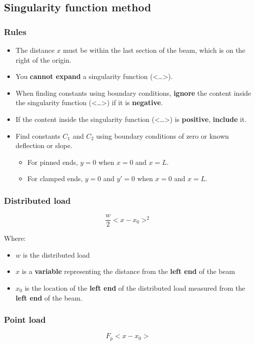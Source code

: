 \documentclass[11pt]{article}
\begin{document}
\newpage

\subsection{Singularity function method}
\label{sec:orge61f9f4}

\subsubsection{Rules}
\label{sec:org301f83d}
\begin{itemize}
\item The distance \(x\) must be within the last section of the beam, which is on the right of the origin.
\item You \textbf{cannot expand} a singularity function (<\ldots{}>).
\item When finding constants using boundary conditions, \textbf{ignore} the content inside the singularity function (<\ldots{}>) if it is \textbf{negative}.
\item If the content inside the singularity function (<\ldots{}>) is \textbf{positive}, \textbf{include} it.
\item Find constants \(C_1\) and \(C_2\) using boundary conditions of zero or known deflection or slope.
\begin{itemize}
\item For pinned ends, \(y = 0\) when \(x = 0\) and \(x = L\).
\item For clamped ends, \(y = 0\) and \(y' = 0\) when \(x = 0\) and \(x = L\).
\end{itemize}
\end{itemize}

\subsubsection{Distributed load}
\label{sec:orgb33c6a5}
\[\frac{w}{2} < x - x_0 >^2\]

Where:
\begin{itemize}
\item \(w\) is the distributed load
\item \(x\) is a \textbf{variable} representing the distance from the \textbf{left end} of the beam
\item \(x_0\) is the location of the \textbf{left end} of the distributed load measured from the \textbf{left end} of the beam.
\end{itemize}

\subsubsection{Point load}
\label{sec:orgc69cce9}
\[F_p < x - x_0 >\]
\end{document}
